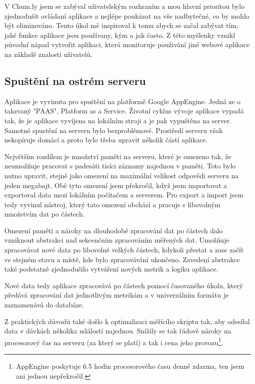 \documentclass[bc,male,java,dept456]{diploma}						%
\begin{document}
V Chum.ly jsem se zabýval uživatelským rozhraním a mou hlavní prioritou bylo zjednodušit ovládaní aplikace a nejlépe poukázat na vše nadbytečné, co by mohlo být eliminováno. Tento úkol mě inspiroval k tomu abych se začal zabývat tím, jaké funkce aplikace jsou používany, kým a jak často. Z této myšlenky vznikl původní nápad vytvořit aplikaci, která monitoruje použivání jiné webové aplikace na základě znalosti uživatelů.


\subsection{Spuštění na ostrém serveru}

Aplikace je vyvinuta pro spuštění na platformě Google AppEngine. Jedná ze o takzvaný "PAAS", Platform as a Service. Životní cyklus vývoje aplikace vypadá tak, že je aplikace vyvíjena na lokálním stroji a je pak vypuštěna na server. Samotné spustění na serveru bylo bezproblémové. Prostředí serveru však nekopíruje domácí a proto bylo třeba upravit několik částí aplikace.

Největším rozdílem je množství paměti na serveru, které je omezeno tak, že ne\-u\-mo\-žňu\-je pracovat s padesáti tisíci záznamy najednou v paměti. Toto bylo nutno upravit, stejně jako omezení na maximální velikost odpovědi serveru na jeden megabajt. Obě tyto omezení jsem překročil, když jsem importovat a exportoval data mezi lokálním počítačem a serverem. Pro export a import jsem tedy vyvinul nástroj, který tato omezení obchází a pracuje s libovolným množstvím dat po částech.

Omezení paměti a nároky na dlouhodobé zpracování dat po částech dalo vzniknout abstrakci nad sekcenčním zpracováním měřených dat. Umožňuje zpracovávat nové data po libovolně velkých částech, kdykoli přestat a zase začít ve stejném stavu a místě, kde bylo zpracovávání ukončeno. Zavedení abstrakce také podstatně zjednodušilo vytváření nových metrik a logiku aplikace.

Nové data tedy aplikace zpracovává po částech pomocí časovaného úkolu, který předává zpracování dat jednotlivým metrikám a v univerzálním formátu je zaznamenává do databáze.

Z praktických důvodů také došlo k optimalizaci měřícího skriptu tak, aby odesílal data v dávkách několika událostí najednou. Snížily se tak řádově nároky na procesorový čas na serveru (za který se platí) a tak i cena jeho provozu\footnote{AppEngine poskytuje 6.5 hodin procesorového času denně zdarma, ten jsem ani jednou nepřekročil.}.
\end{document}
